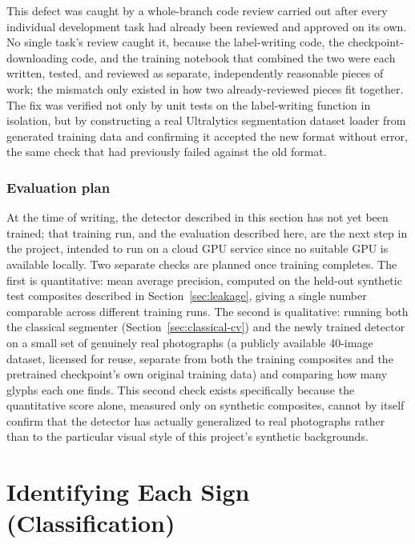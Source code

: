 \documentclass[11pt,a4paper]{report}
\begin{document}
This defect was caught by a whole-branch code review carried out after
every individual development task had already been reviewed and approved
on its own. No single task's review caught it, because the label-writing
code, the checkpoint-downloading code, and the training notebook that
combined the two were each written, tested, and reviewed as separate,
independently reasonable pieces of work; the mismatch only existed in how
two already-reviewed pieces fit together. The fix was verified not only by
unit tests on the label-writing function in isolation, but by constructing
a real Ultralytics segmentation dataset loader from generated training data
and confirming it accepted the new format without error, the same check
that had previously failed against the old format.

\subsection{Evaluation plan}
\label{sec:detector-evaluation}

At the time of writing, the detector described in this section has not yet
been trained; that training run, and the evaluation described here, are the
next step in the project, intended to run on a cloud GPU service since no
suitable GPU is available locally. Two separate checks are planned once
training completes. The first is quantitative: mean average precision,
computed on the held-out synthetic test composites described in
Section~\ref{sec:leakage}, giving a single number comparable across
different training runs. The second is qualitative: running both the
classical segmenter (Section~\ref{sec:classical-cv}) and the newly trained
detector on a small set of genuinely real photographs (a publicly available
40-image dataset, licensed for reuse, separate from both the training
composites and the pretrained checkpoint's own original training data) and
comparing how many glyphs each one finds. This second check exists
specifically because the quantitative score alone, measured only on
synthetic composites, cannot by itself confirm that the detector has
actually generalized to real photographs rather than to the particular
visual style of this project's synthetic backgrounds.

\chapter{Identifying Each Sign (Classification)}
\label{ch:classification}
\end{document}
